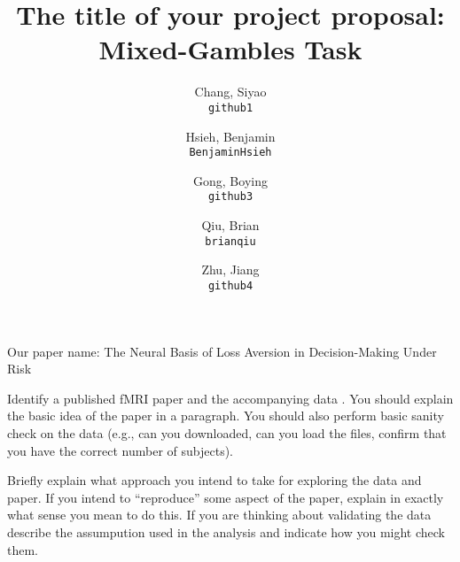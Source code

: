 \documentclass[11pt]{article}
\title{The title of your project proposal: Mixed-Gambles Task}
\author{

  Chang, Siyao\\
  \texttt{github1}
  \and
  Hsieh, Benjamin\\
  \texttt{BenjaminHsieh}
  \and
  Gong, Boying\\
  \texttt{github3}
  \and
  Qiu, Brian\\
  \texttt{brianqiu}
  \and
  Zhu, Jiang\\
  \texttt{github4}
}
\begin{document}
\maketitle
Our paper name: The Neural Basis of Loss Aversion in Decision-Making Under Risk

Identify a published fMRI paper and the accompanying data
\cite{lindquist2008statistical}.  You should explain the basic idea of the
paper in a paragraph.  You should also perform basic sanity check on the data
(e.g., can you downloaded, can you load the files, confirm that you have the
correct number of subjects).

Briefly explain what approach you intend to take for exploring
the data and paper.  If you intend to ``reproduce'' some aspect of the paper,
explain in exactly what sense you mean to do this.  If you are thinking about
validating the data describe the assumpution used in the analysis and indicate
how you might check them.


\end{document}
